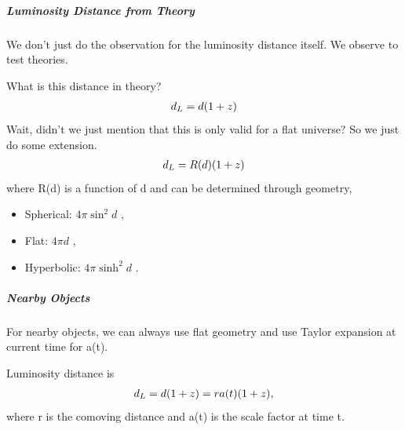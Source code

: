 \documentclass[letterpaper,10pt,english]{sphinxmanual}
\begin{document}
\subparagraph{Luminosity Distance from Theory}
\label{Cosmology/cosmoIndex:luminosity-distance-from-theory}
We don't just do the observation for the luminosity distance itself.
We observe to test theories.

What is this distance in theory?
\begin{gather}
\begin{split}d_L = d (1+z)\end{split}\notag
\end{gather}
Wait, didn't we just mention that this is only valid for a flat universe? So we just do some extension.
\begin{gather}
\begin{split}d_L = R(d) (1+z)\end{split}\notag
\end{gather}
where R(d) is a function of d and can be determined through geometry,
\begin{itemize}
\item {} 
Spherical: \(4\pi \sin^2 d\) ,

\item {} 
Flat: \(4\pi d\) ,

\item {} 
Hyperbolic: \(4\pi \sinh^2 d\) .

\end{itemize}


\subparagraph{Nearby Objects}
\label{Cosmology/cosmoIndex:nearby-objects}
For nearby objects, we can always use flat geometry and use Taylor expansion at current time for a(t).

Luminosity distance is
\begin{gather}
\begin{split}d_L = d (1+z) = r a(t) (1+z) ,\end{split}\notag
\end{gather}
where r is the comoving distance and a(t) is the scale factor at time t.
\end{document}
